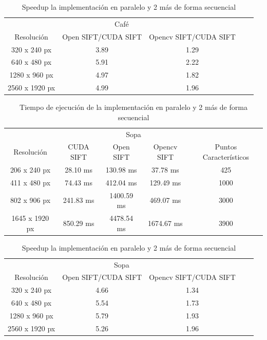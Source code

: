 \begin{table}[phtb]
\centering
\begin{tabular}{|c|c|c|c|c|}
\hline
\multicolumn{3}{|c|}{Café} \\
\cline{1-3}
Resolución & Open SIFT/CUDA SIFT & Opencv SIFT/CUDA SIFT \\
\hline \hline
 320 x 240 px  & 3.89   &  1.29   \\ \cline{1-3}
 640 x 480 px  & 5.91   &  2.22  \\ \cline{1-3}
1280 x 960 px  & 4.97   &  1.82  \\ \cline{1-3}
2560 x 1920 px & 4.99   &  1.96 \\ \cline{1-3}
\end{tabular}
\caption{Speedup la implementación en paralelo y 2 más de forma secuencial}
\label{tabla:final}
\end{table}

\begin{table}[phtb]
\centering
\begin{tabular}{|c|c|c|c|c|}
\hline
\multicolumn{5}{|c|}{Sopa} \\
\cline{1-5}
Resolución & CUDA SIFT & Open SIFT & Opencv SIFT & Puntos Característicos\\
\hline \hline
 206 x 240 px  & 28.10 ms  &  130.98 ms  & 37.78 ms   & 425\\ \cline{1-5}
 411 x 480 px  & 74.43 ms  &  412.04 ms  & 129.49 ms  & 1000\\ \cline{1-5}
 802 x 906 px  & 241.83 ms &  1400.59 ms & 469.07 ms  & 3000\\ \cline{1-5}
1645 x 1920 px & 850.29 ms &  4478.54 ms & 1674.67 ms & 3900\\ \cline{1-5}
\end{tabular}
\caption{Tiempo de ejecución de la implementación en paralelo y 2 más de forma secuencial}
\label{tabla:final}
\end{table}

\begin{table}[phtb]
\centering
\begin{tabular}{|c|c|c|c|c|}
\hline
\multicolumn{3}{|c|}{Sopa} \\
\cline{1-3}
Resolución & Open SIFT/CUDA SIFT & Opencv SIFT/CUDA SIFT \\
\hline \hline
 320 x 240 px  &  4.66  &  1.34   \\ \cline{1-3}
 640 x 480 px  &  5.54  &  1.73  \\ \cline{1-3}
1280 x 960 px  &  5.79  &  1.93  \\ \cline{1-3}
2560 x 1920 px &  5.26  &  1.96 \\ \cline{1-3}
\end{tabular}
\caption{Speedup la implementación en paralelo y 2 más de forma secuencial}
\label{tabla:final}
\end{table}

